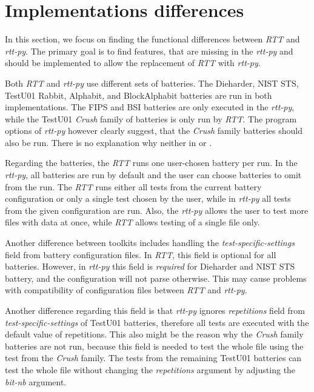 \documentclass[
  digital,     %
  oneside,     %
  nosansbold,  %
  nocolorbold, %
  nolof,         %
  nolot,         %
]{fithesis4}
\begin{document}

\section{Implementations differences}
In this section, we focus on finding the functional differences between \emph{RTT} and \emph{rtt-py}. The primary goal is to find features, that are missing in the \emph{rtt-py} and should be implemented to allow the replacement of \emph{RTT} with \emph{rtt-py}. 

Both \emph{RTT} and \emph{rtt-py} use different sets of batteries. The Dieharder, NIST STS, TestU01 Rabbit, Alphabit, and BlockAlphabit batteries are run in both implementations. The FIPS and BSI batteries are only executed in the \emph{rtt-py}, while the TestU01 \emph{Crush} family of batteries is only run by \emph{RTT}. The program options of \emph{rtt-py} however clearly suggest, that the \emph{Crush} family batteries should also be run. There is no explanation why neither in \cite{vavercak} or \cite{rtt-py-site}.

Regarding the batteries, the \emph{RTT} runs one user-chosen battery per run. In the \emph{rtt-py}, all batteries are run by default and the user can choose batteries to omit from the run. The \emph{RTT} runs either all tests from the current battery configuration or only a single test chosen by the user, while in \emph{rtt-py} all tests from the given configuration are run. Also, the \emph{rtt-py} allows the user to test more files with data at once, while \emph{RTT} allows testing of a single file only.

Another difference between toolkits includes handling the \emph{test-specific-settings} field from battery configuration files. In \emph{RTT}, this field is optional for all batteries. However, in \emph{rtt-py} this field is \emph{required} for Dieharder and NIST STS battery, and the configuration will not parse otherwise. This may cause problems with compatibility of configuration files between \emph{RTT} and \emph{rtt-py}.

Another difference regarding this field is that \emph{rtt-py} ignores \emph{repetitions} field from \emph{test-specific-settings} of TestU01 batteries, therefore all tests are executed with the default value of repetitions. This also might be the reason why the \emph{Crush} family batteries are not run, because this field is needed to test the whole file using the test from the \emph{Crush} family. The tests from the remaining TestU01 batteries can test the whole file without changing the \emph{repetitions} argument by adjusting the \emph{bit-nb} argument.
\end{document}
